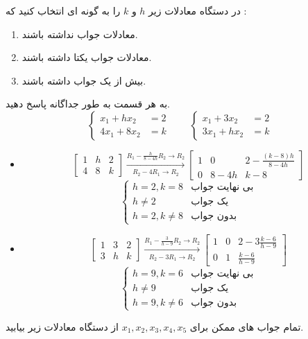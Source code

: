 \documentclass{article}
\begin{document}
در دستگاه معادلات زیر 
$h$
و 
$k$
را به گونه ای انتخاب کنید که :
\begin{enumerate}
\item
معادلات جواب نداشته باشند.
\item 
معادلات جواب یکتا داشته باشند.
\item 
بیش از یک جواب داشته باشند.

\end{enumerate}
به هر قسمت به طور جداگانه پاسخ دهید.
\begin{equation*}
\left\{
\begin{array}{rl}
x_1+hx_2&=2\\
4x_1+8x_2&=k
\end{array} \right.\qquad
\left\{
\begin{array}{rl}
x_1+3x_2&=2\\
3x_1+hx_2&=k
\end{array} \right.
\end{equation*}
\begin{حل}
	\begin{itemize}
		\item
	$$	\begin{bmatrix}
		1&h&2\\
		4&8&k	
		\end{bmatrix}\xrightarrow[R_2-4R_1\to R_2]{R_1-\frac{h}{8-4h}R_2\to R_2}
		\begin{bmatrix}
		1&0&2-\frac{(k-8)h}{8-4h}\\
		0&8-4h&k-8	
		\end{bmatrix}$$
		$$\left\{
		\begin{array}{rl}
		h=2,k=8 &\text{بی نهایت جواب}\\
		h\neq2 & \text{یک جواب} \\
		h=2,k\neq8 &\text{بدون جواب} 
		\end{array} \right.$$
		
		\item
		$$	\begin{bmatrix}
		1&3&2\\
		3&h&k	
		\end{bmatrix}\xrightarrow[R_2-3R_1\to R_2]{R_1-\frac{3}{h-9}R_2\to R_2}
		\begin{bmatrix}
		1&0&2-3\frac{k-6}{h-9}\\
		0&1&\frac{k-6}{h-9}	
		\end{bmatrix}$$
		$$\left\{
		\begin{array}{rl}
		h=9,k=6 &\text{بی نهایت جواب}\\
		h\neq 9 & \text{یک جواب} \\
		h=9,k\neq6 &\text{بدون جواب} 
		\end{array} \right.$$
	\end{itemize}
\end{حل}
تمام جواب های ممکن برای 
$x_1,x_2,x_3,x_4,x_5$
از دستگاه معادلات زیر بیابید.
\end{document}
